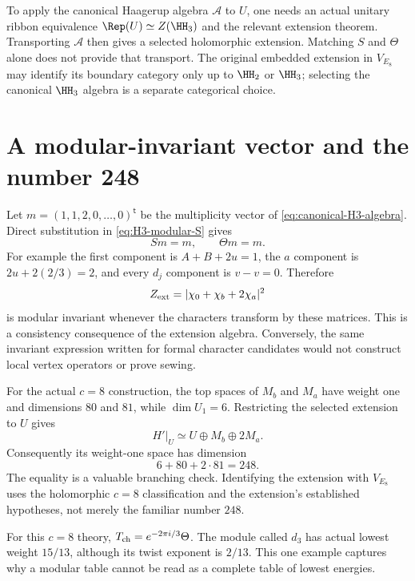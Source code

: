 To apply the canonical Haagerup algebra $\mathcal A$ to $U$, one
needs an actual unitary ribbon
equivalence $\Rep(U)\simeq Z(\HH_3)$ and the relevant extension
theorem.  Transporting $\mathcal A$ then gives a selected holomorphic
extension.  Matching $S$ and $\Theta$ alone does not provide that
transport.  The original embedded extension in $V_{E_8}$ may identify
its boundary category only up to $\HH_2$ or $\HH_3$; selecting
the canonical $\HH_3$ algebra is a separate categorical choice.

\section{A modular-invariant vector and the number 248}

Let $m=(1,1,2,0,\ldots,0)^{\mathsf t}$ be the multiplicity vector
of \eqref{eq:canonical-H3-algebra}.  Direct substitution in
\eqref{eq:H3-modular-S} gives
\begin{equation}
 Sm=m,\qquad \Theta m=m.
 \label{eq:extension-modular-vector}
\end{equation}
For example the first component is
$A+B+2u=1$, the $a$ component is $2u+2(2/3)=2$,
and every $d_j$ component is $v-v=0$.
Therefore
\begin{equation}
 Z_{\rm ext}=|\chi_0+\chi_b+2\chi_a|^2
 \label{eq:extension-partition-function}
\end{equation}
is modular invariant whenever the characters transform by these
matrices.  This is a consistency consequence of the extension
algebra.  Conversely, the same invariant expression written for
formal character candidates would not construct local vertex
operators or prove sewing.

For the actual $c=8$ construction, the top spaces of $M_b$ and
$M_a$ have weight one and dimensions $80$ and $81$, while
$\dim U_1=6$.  Restricting the selected extension to $U$ gives
\[
 H'|_U\simeq U\oplus M_b\oplus2M_a.
\]
Consequently its weight-one space has dimension
\begin{equation}
 6+80+2\cdot81=248.
 \label{eq:248-branching-check}
\end{equation}
The equality is a valuable branching check.  Identifying the
extension with $V_{E_8}$ uses the holomorphic $c=8$ classification
and the extension's established hypotheses, not merely the familiar
number $248$.

For this $c=8$ theory,
$T_{\rm ch}=e^{-2\pi i/3}\Theta$.  The module called $d_3$
has actual lowest weight $15/13$, although its twist exponent is
$2/13$.  This one example captures why a modular table cannot be
read as a complete table of lowest energies.

